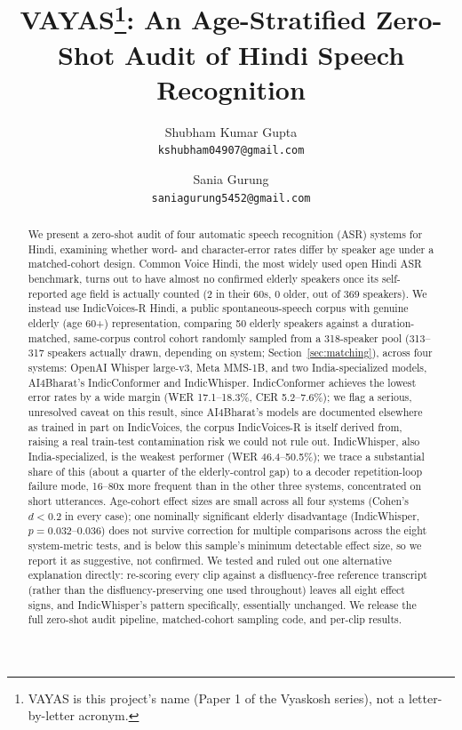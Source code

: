 \documentclass[11pt]{article}
\title{\textbf{VAYAS\thanks{VAYAS is this project's name (Paper 1 of the Vyaskosh series), not a
letter-by-letter acronym.}: An Age-Stratified Zero-Shot Audit of Hindi Speech Recognition}}
\author{Shubham Kumar Gupta \\ \texttt{kshubham04907@gmail.com} \and Sania Gurung \\ \texttt{saniagurung5452@gmail.com}}
\date{}
\begin{document}
\maketitle

\begin{abstract}
We present a zero-shot audit of four automatic speech recognition (ASR) systems for Hindi,
examining whether word- and character-error rates differ by speaker age under a matched-cohort
design. Common Voice Hindi, the most widely used open Hindi ASR benchmark, turns out to have
almost no confirmed elderly speakers once its self-reported age field is actually counted (2 in
their 60s, 0 older, out of 369 speakers). We instead use IndicVoices-R Hindi, a public
spontaneous-speech corpus with genuine elderly (age 60+) representation, comparing 50 elderly
speakers against a duration-matched, same-corpus control cohort randomly sampled from a 318-speaker
pool (313--317 speakers actually drawn, depending on system; Section~\ref{sec:matching}),
across four systems: OpenAI Whisper large-v3, Meta MMS-1B, and two India-specialized models,
AI4Bharat's IndicConformer and IndicWhisper. IndicConformer achieves the lowest error rates by a
wide margin (WER 17.1--18.3\%, CER 5.2--7.6\%); we flag a serious, unresolved caveat on this
result, since AI4Bharat's models are documented elsewhere as trained in part on IndicVoices, the
corpus IndicVoices-R is itself derived from, raising a real train-test contamination risk we
could not rule out. IndicWhisper, also India-specialized, is the weakest performer (WER
46.4--50.5\%); we trace a substantial share of this (about a quarter of the elderly-control gap)
to a decoder repetition-loop failure mode, 16--80x more frequent than in the other three systems,
concentrated on short utterances. Age-cohort effect sizes are small across all four systems
(Cohen's $d < 0.2$ in every case); one nominally significant elderly disadvantage (IndicWhisper,
$p = 0.032$--$0.036$) does not survive correction for multiple comparisons across the eight
system-metric tests, and is below this sample's minimum detectable effect size, so we report it
as suggestive, not confirmed. We tested and ruled out one alternative explanation directly:
re-scoring every clip against a disfluency-free reference transcript (rather than the
disfluency-preserving one used throughout) leaves all eight effect signs, and IndicWhisper's
pattern specifically, essentially unchanged. We release the full zero-shot audit pipeline,
matched-cohort sampling code, and per-clip results.
\end{abstract}
\end{document}
